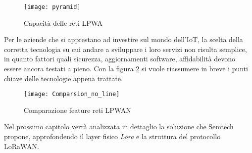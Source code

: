 \begin{figure}[ht]
    \centering 
                \texttt{[image: pyramid]}
    \caption{Capacità delle reti LPWA}
    \label{fig:pyramid} 
\end{figure}

\pagebreak
Per le aziende che si apprestano ad investire sul mondo dell'IoT, la scelta
della corretta tecnologia su cui andare a sviluppare i loro servizi non risulta
semplice, in quanto fattori quali sicurezza, aggiornamenti software,
affidabilità devono essere ancora testati a pieno. Con la figura
\ref{fig:feature_comp} si vuole riassumere in breve i punti chiave delle
tecnologie appena trattate.

\begin{figure}[ht]
    \centering 
                \texttt{[image: Comparsion\_no\_line]}
    \caption{Comparazione feature reti LPWAN}
    \label{fig:feature_comp} 
\end{figure}

Nel prossimo capitolo verrà analizzata in dettaglio la soluzione che Semtech
propone, approfondendo il layer fisico \emph{Lora} e la struttura del protocollo
LoRaWAN.
